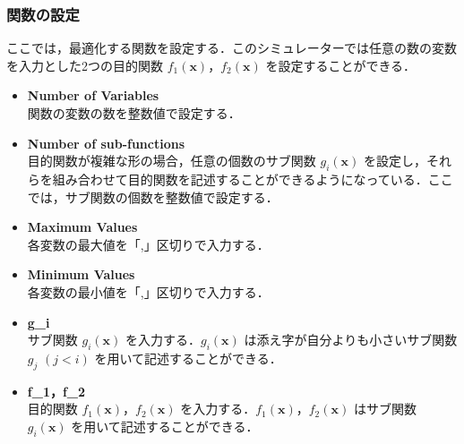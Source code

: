 \documentclass[a4paper, twocolumn]{ltjsarticle}
\begin{document}
\subsubsection{関数の設定}
ここでは，最適化する関数を設定する．このシミュレーターでは任意の数の変数を入力とした2つの目的関数 $f_1(\boldsymbol{x})$，$f_2(\boldsymbol{x})$ を設定することができる．
\begin{itemize}
    \item \textbf{Number of Variables}\\
        関数の変数の数を整数値で設定する．
    \item \textbf{Number of sub-functions}\\
        目的関数が複雑な形の場合，任意の個数のサブ関数 $g_i(\boldsymbol{x})$ を設定し，それらを組み合わせて目的関数を記述することができるようになっている．ここでは，サブ関数の個数を整数値で設定する．
    \item \textbf{Maximum Values}\\
        各変数の最大値を「,」区切りで入力する．
    \item \textbf{Minimum Values}\\
        各変数の最小値を「,」区切りで入力する．
    \item \textbf{g\_i}\\
        サブ関数 $g_i(\boldsymbol{x})$ を入力する．$g_i(\boldsymbol{x})$ は添え字が自分よりも小さいサブ関数 $g_j$ $(j < i)$ を用いて記述することができる．
    \item \textbf{f\_1，f\_2}\\
        目的関数 $f_1(\boldsymbol{x})$，$f_2(\boldsymbol{x})$ を入力する．$f_1(\boldsymbol{x})$，$f_2(\boldsymbol{x})$ はサブ関数 $g_i(\boldsymbol{x})$ を用いて記述することができる．
\end{itemize}
\end{document}
